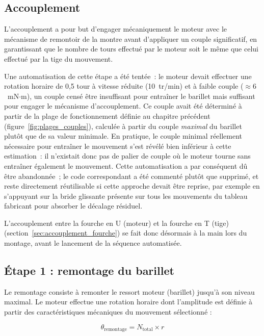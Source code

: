 \subsection{Accouplement}
\label{sec:accouplement}

L'accouplement a pour but d'engager mécaniquement le moteur avec le
mécanisme de remontoir de la montre avant d'appliquer un couple significatif,
en garantissant que le nombre de tours effectué par le moteur soit le même
que celui effectué par la tige du mouvement.

Une automatisation de cette étape a été tentée~: le moteur devait effectuer
une rotation horaire de 0{,}5 tour à vitesse réduite (10~tr/min) et à faible
couple ($\approx 6$~mN$\cdot$m), un couple censé être insuffisant pour
entraîner le barillet mais suffisant pour engager le mécanisme d'accouplement.
Ce couple avait été déterminé à partir de la plage de fonctionnement définie
au chapitre précédent (figure~\ref{fig:plages_couples}), calculée à partir du
couple \emph{maximal} du barillet plutôt que de sa valeur minimale. En
pratique, le couple minimal réellement nécessaire pour entraîner le mouvement
s'est révélé bien inférieur à cette estimation~: il n'existait donc pas de
palier de couple où le moteur tourne sans entraîner également le mouvement.
Cette automatisation a par conséquent dû être abandonnée~; le code
correspondant a été commenté plutôt que supprimé, et reste directement
réutilisable si cette approche devait être reprise, par exemple en
s'appuyant sur la bride glissante présente sur tous les mouvements du tableau
fabricant pour absorber le décalage résiduel.

L'accouplement entre la fourche en U (moteur) et la fourche en T (tige)
(section~\ref{sec:accouplement_fourche}) se fait donc désormais à la main
lors du montage, avant le lancement de la séquence automatisée.

\subsection{Étape 1 : remontage du barillet}

Le remontage consiste à remonter le ressort moteur (barillet) jusqu'à son niveau maximal.
Le moteur effectue une rotation horaire dont l'amplitude est définie à partir des caractéristiques mécaniques du
mouvement sélectionné :

\begin{equation}
    \theta_{\text{remontage}} = N_{\text{total}} \times r
    \label{eq:remontage}
\end{equation}

